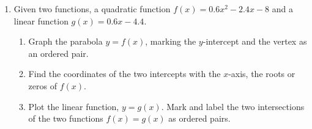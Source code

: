 \documentclass[12pt, twoside]{article}
\begin{document}
\begin{enumerate}
\newpage
\item Given two functions, a quadratic function $f(x)=0.6x^2-2.4x-8$ and a linear function $g(x)=0.6x-4.4$.
    \begin{enumerate}%
        \item Graph the parabola $y=f(x)$, marking the $y$-intercept and the vertex as an ordered pair.
        \item Find the coordinates of the two intercepts with the $x$-axis, the roots or zeros of $f(x)$.\vspace{1cm}
        \item Plot the linear function, $y=g(x)$. Mark and label the two intersections of the two functions $f(x)=g(x)$ as ordered pairs.
    \end{enumerate}
    \begin{center}
    \end{center}


\end{enumerate}
\end{document}
